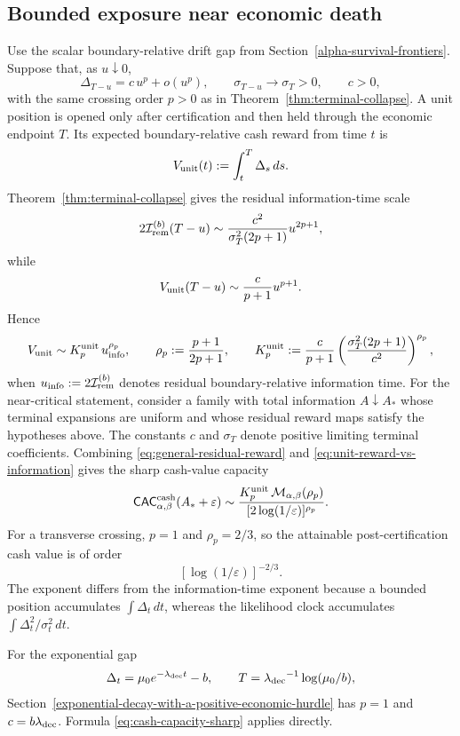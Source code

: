 \documentclass[11pt]{article}
\numberwithin{equation}{section}
\theoremstyle{plain}
\theoremstyle{definition}
\theoremstyle{remark}
\begin{document}
\subsection{Bounded exposure near economic death}\label{bounded-exposure-economic-death}

Use the scalar boundary-relative drift gap from Section~\ref{alpha-survival-frontiers}.  Suppose that, as $u\downarrow0$,
\[
\Delta_{T-u}=c\,u^p+o(u^p),
\qquad
\sigma_{T-u}\to\sigma_T>0,
\qquad c>0,
\]
with the same crossing order $p>0$ as in Theorem~\ref{thm:terminal-collapse}.  A unit position is opened only after certification and then held through the economic endpoint $T$.  Its expected boundary-relative cash reward from time $t$ is
\[
V_{\rm unit}(t):=\int_t^T\Delta_s\,ds.
\]
Theorem~\ref{thm:terminal-collapse} gives the residual information-time scale
\[
2\mathcal I_{\rm rem}^{(b)}(T-u)
\sim
\frac{c^2}{\sigma_T^2(2p+1)}u^{2p+1},
\]
while
\[
V_{\rm unit}(T-u)
\sim\frac{c}{p+1}u^{p+1}.
\]
Hence
\begin{equation}\label{eq:unit-reward-vs-information}
V_{\rm unit}
\sim K_p^{\rm unit}\,u_{\rm info}^{\rho_p},
\qquad
\rho_p:=\frac{p+1}{2p+1},
\qquad
K_p^{\rm unit}:=\frac{c}{p+1}
\left(\frac{\sigma_T^2(2p+1)}{c^2}\right)^{\rho_p},
\end{equation}
when $u_{\rm info}:=2\mathcal I_{\rm rem}^{(b)}$ denotes residual boundary-relative information time.
For the near-critical statement, consider a family with total information
$A\downarrow A_*$ whose terminal expansions are uniform and whose residual
reward maps satisfy the hypotheses above. The constants $c$ and $\sigma_T$
denote positive limiting terminal coefficients. Combining
\eqref{eq:general-residual-reward} and \eqref{eq:unit-reward-vs-information}
gives the sharp cash-value capacity
\begin{equation}\label{eq:cash-capacity-sharp}
\mathsf{CAC}^{\rm cash}_{\alpha,\beta}(A_*+\varepsilon)
\sim
\frac{K_p^{\rm unit}\,\mathcal M_{\alpha,\beta}(\rho_p)}
{[2\log(1/\varepsilon)]^{\rho_p}}.
\end{equation}
For a transverse crossing, $p=1$ and $\rho_p=2/3$, so the attainable post-certification cash value is of order
\[
[\log(1/\varepsilon)]^{-2/3}.
\]
The exponent differs from the information-time exponent because a bounded position accumulates $\int\Delta_t\,dt$, whereas the likelihood clock accumulates $\int\Delta_t^2/\sigma_t^2\,dt$.

For the exponential gap
\[
\Delta_t=\mu_0e^{-{\lambda_{{\rm dec}}} t}-b,
\qquad
T={\lambda_{{\rm dec}}}^{-1}\log(\mu_0/b),
\]
Section~\ref{exponential-decay-with-a-positive-economic-hurdle} has $p=1$ and $c=b{\lambda_{{\rm dec}}}$.  Formula \eqref{eq:cash-capacity-sharp} applies directly.
\end{document}
